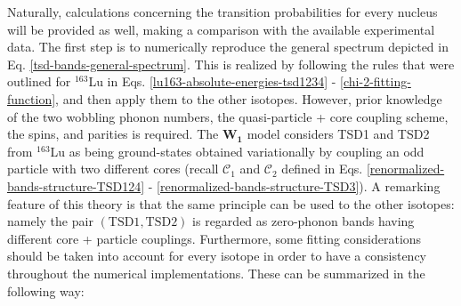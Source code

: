 Naturally, calculations concerning the transition probabilities for every nucleus will be provided as well, making a comparison with the available experimental data. The first step is to numerically reproduce the general spectrum depicted in Eq. \ref{tsd-bands-general-spectrum}. This is realized by following the rules that were outlined for $^{163}$Lu in Eqs. \ref{lu163-absolute-energies-tsd1234} - \ref{chi-2-fitting-function}, and then apply them to the other isotopes. However, prior knowledge of the two wobbling phonon numbers, the quasi-particle + core coupling scheme, the spins, and parities is required. The $\mathbf{W_1}$ model considers TSD1 and TSD2 from $^{163}$Lu as being ground-states obtained variationally by coupling an odd particle with two different cores (recall $\mathscr{C}_1$ and $\mathscr{C}_2$ defined in Eqs. \ref{renormalized-bands-structure-TSD124} - \ref{renormalized-bands-structure-TSD3}). A remarking feature of this theory is that the same principle can be used to the other isotopes: namely the pair $(\text{TSD1},\text{TSD2})$ is regarded as zero-phonon bands having different core + particle couplings. Furthermore, some fitting considerations should be taken into account for every isotope in order to have a consistency throughout the numerical implementations. These can be summarized in the following way:
